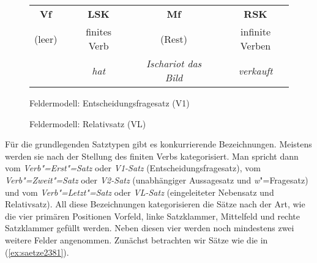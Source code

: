 \begin{figure}
    \begin{tabular}{cp{0.1em}cp{0.1em}cp{0.1em}c}
      \textbf{Vf} && \textbf{LSK} && \textbf{Mf} && \textbf{RSK} \\
      \cmidrule{1-1}\cmidrule{3-3}\cmidrule{5-5}\cmidrule{7-7}
	(leer) && finites Verb && (Rest) && infinite Verben \\
	&& \textit{hat} && \textit{Ischariot das Bild} && \textit{verkauft} \\
    \end{tabular}
  \caption{Feldermodell: Entscheidungsfragesatz (V1)}
  \label{fig:feldertypen3}
\end{figure}

\begin{figure}
  \caption{Feldermodell: Relativsatz (VL)}
  \label{fig:feldertypen4}
\end{figure}


Für die grundlegenden Satztypen gibt es konkurrierende Bezeichnungen.
Meistens werden sie nach der Stellung des finiten Verbs kategorisiert.
Man spricht dann vom \textit{Verb"=Erst"=Satz} oder \textit{V1-Satz} (Entscheidungsfragesatz), vom \textit{Verb"=Zweit"=Satz} oder \textit{V2-Satz} (unabhängiger Aussagesatz und \textit{w}"=Fragesatz) und vom \textit{Verb"=Letzt"=Satz} oder \textit{VL-Satz} (eingeleiteter Nebensatz und Relativsatz).
All diese Bezeichnungen kategorisieren die Sätze nach der Art, wie die vier primären Positionen Vorfeld, linke Satzklammer, Mittelfeld und rechte Satzklammer gefüllt werden.
Neben diesen vier werden noch mindestens zwei weitere Felder angenommen.
Zunächst betrachten wir Sätze wie die in (\ref{ex:saetze2381}).

\begin{exe}
  \ex\label{ex:saetze2381}
  \begin{xlist}
  \end{xlist}
\end{exe}

